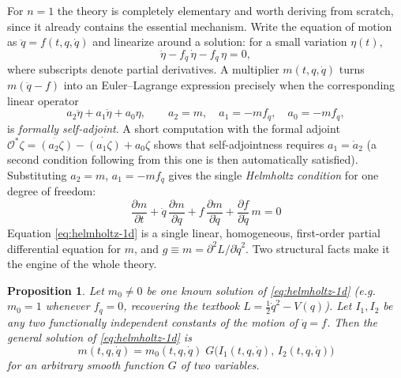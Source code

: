 \documentclass[11pt]{article}
\newtheorem{proposition}{Proposition}[section]
\theoremstyle{remark}
\begin{document}
For $n=1$ the theory is completely elementary and worth deriving from scratch, since it already contains the essential mechanism. Write the equation of motion as $\ddot q = f(t,q,\dot q)$ and linearize around a solution: for a small variation $\eta(t)$,
\begin{equation}
\ddot \eta - f_{\dot q}\,\dot\eta - f_q\,\eta = 0 ,
\end{equation}
where subscripts denote partial derivatives. A multiplier $m(t,q,\dot q)$ turns $m(\ddot q - f)$ into an Euler--Lagrange expression precisely when the corresponding linear operator
\begin{equation}
a_2\ddot \eta + a_1\dot\eta + a_0\eta, \qquad a_2=m,\quad a_1=-m f_{\dot q},\quad a_0=-mf_q,
\end{equation}
is \emph{formally self-adjoint}. A short computation with the formal adjoint $\mathcal O^*\zeta = \ddot{(a_2\zeta)}-\dot{(a_1\zeta)}+a_0\zeta$ shows that self-adjointness requires $a_1=\dot a_2$ (a second condition following from this one is then automatically satisfied). Substituting $a_2=m$, $a_1=-mf_{\dot q}$ gives the single \emph{Helmholtz condition} for one degree of freedom:
\begin{equation}
\boxed{\ \frac{\partial m}{\partial t}+\dot q\,\frac{\partial m}{\partial q}+f\,\frac{\partial m}{\partial \dot q}+\frac{\partial f}{\partial \dot q}\,m = 0\ }
\label{eq:helmholtz-1d}
\end{equation}
Equation \eqref{eq:helmholtz-1d} is a single linear, homogeneous, first-order partial differential equation for $m$, and $g\equiv m=\partial^2 L/\partial \dot q^2$. Two structural facts make it the engine of the whole theory.

\begin{proposition}
\label{prop:general-solution}
Let $m_0\neq 0$ be one known solution of \eqref{eq:helmholtz-1d} (e.g.\ $m_0=1$ whenever $f_{\dot q}=0$, recovering the textbook $L=\tfrac12\dot q^2 - V(q)$). Let $I_1,I_2$ be any two functionally independent constants of the motion of $\ddot q = f$. Then the general solution of \eqref{eq:helmholtz-1d} is
\begin{equation}
m(t,q,\dot q) = m_0(t,q,\dot q)\;G\big(I_1(t,q,\dot q),\,I_2(t,q,\dot q)\big)
\label{eq:general-multiplier}
\end{equation}
for an arbitrary smooth function $G$ of two variables.
\end{proposition}
\end{document}
